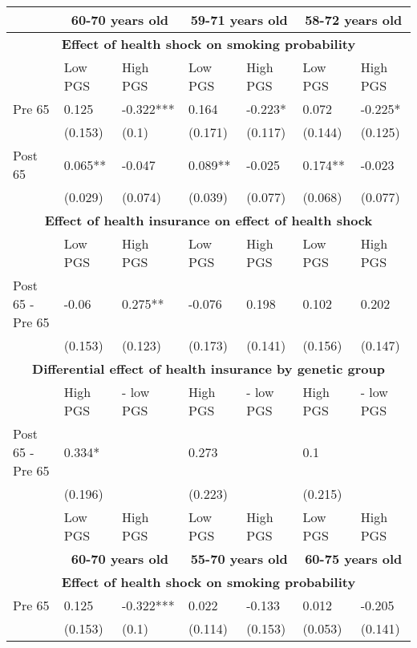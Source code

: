% 
\begin{tabular}{l| p{2cm}p{2cm}| p{2cm}p{2cm}| p{2cm}p{2cm}}
   & \multicolumn{2}{c}{ \textbf{60-70 years old}} & \multicolumn{2}{c}{ \textbf{59-71 years old}} & \multicolumn{2}{c}{ \textbf{58-72 years old}} \\
 \toprule
  \multicolumn{7}{c}{ \textbf{Effect of health shock on smoking probability}} \\
 \midrule
 & Low PGS & High PGS & Low PGS & High PGS & Low PGS & High PGS \\ 
   \midrule
Pre 65 & 0.125 & -0.322*** & 0.164 & -0.223* & 0.072 & -0.225* \\ 
   & (0.153) & (0.1) & (0.171) & (0.117) & (0.144) & (0.125) \\ 
  Post 65 & 0.065** & -0.047 & 0.089** & -0.025 & 0.174** & -0.023 \\ 
   & (0.029) & (0.074) & (0.039) & (0.077) & (0.068) & (0.077) \\ 
   \toprule \multicolumn{7}{c}{ \textbf{Effect of health insurance on effect of health shock}} \\
 \midrule
 & Low PGS & High PGS & Low PGS & High PGS & Low PGS & High PGS \\ 
   \midrule
Post 65 - Pre 65 & -0.06 & 0.275** & -0.076 & 0.198 & 0.102 & 0.202 \\ 
   & (0.153) & (0.123) & (0.173) & (0.141) & (0.156) & (0.147) \\ 
   \toprule \multicolumn{7}{c}{ \textbf{Differential effect of health insurance by genetic group}} \\
 \midrule
 & High PGS  & - low PGS & High PGS  & - low PGS & High PGS  & - low PGS \\ 
   \midrule
Post 65 - Pre 65 & 0.334* &  & 0.273 &  & 0.1 &  \\ 
   & (0.196) &  & (0.223) &  & (0.215) &  \\ 
   & Low PGS & High PGS & Low PGS & High PGS & Low PGS & High PGS \\ 
   \toprule & \multicolumn{2}{c}{ \textbf{60-70 years old}} & \multicolumn{2}{c}{ \textbf{55-70 years old}} & \multicolumn{2}{c}{ \textbf{60-75 years old}} \\
 \toprule \multicolumn{7}{c}{ \textbf{Effect of health shock on smoking probability}} \\
 \midrule
Pre 65 & 0.125 & -0.322*** & 0.022 & -0.133 & 0.012 & -0.205 \\ 
   \midrule
 & (0.153) & (0.1) & (0.114) & (0.153) & (0.053) & (0.141) \\ 

\end{tabular}
